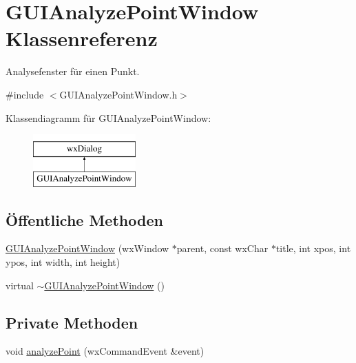 \hypertarget{classGUIAnalyzePointWindow}{\section{G\-U\-I\-Analyze\-Point\-Window Klassenreferenz}
\label{classGUIAnalyzePointWindow}
}


Analysefenster für einen Punkt.  




{\ttfamily \#include $<$G\-U\-I\-Analyze\-Point\-Window.\-h$>$}

Klassendiagramm für G\-U\-I\-Analyze\-Point\-Window\-:\begin{figure}[H]
\begin{center}
\leavevmode
\includegraphics[height=2.000000cm]{classGUIAnalyzePointWindow}
\end{center}
\end{figure}
\subsection*{Öffentliche Methoden}
\begin{DoxyCompactItemize}
\item 
\hyperlink{classGUIAnalyzePointWindow_abf699fcd4ffb8bec8b0565e6404b0af3}{G\-U\-I\-Analyze\-Point\-Window} (wx\-Window $\ast$parent, const wx\-Char $\ast$title, int xpos, int ypos, int width, int height)
\item 
virtual \hyperlink{classGUIAnalyzePointWindow_a9edaece1fef847902309af1f63eb168a}{$\sim$\-G\-U\-I\-Analyze\-Point\-Window} ()
\end{DoxyCompactItemize}
\subsection*{Private Methoden}
\begin{DoxyCompactItemize}
\item 
void \hyperlink{classGUIAnalyzePointWindow_aa84ea9958e8b41423f01316d01ba5151}{analyze\-Point} (wx\-Command\-Event \&event)
\end{DoxyCompactItemize}
